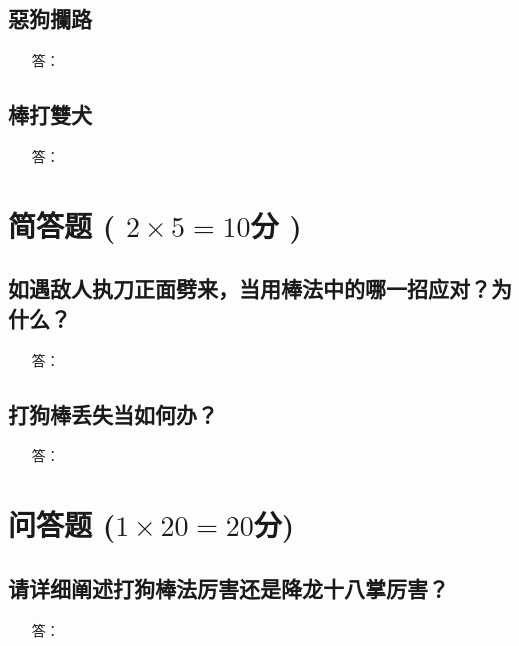 \documentclass[a3]{swfcexam}
\begin{document}
\subsection*{惡狗攔路}
\begin{itemize}
\item[答：] 
\end{itemize}
\vspace{20em}

\subsection*{棒打雙犬}
\begin{itemize}
\item[答：] 
\end{itemize}

\vspace{20em}

\vfill%
\section{简答题 ( $2\times 5=10$分 )}

\subsection{如遇敌人执刀正面劈来，当用棒法中的哪一招应对？为什么？}
\begin{itemize}
\item[答：] 
\end{itemize}

\vspace{20em}
\vfill%
\subsection{打狗棒丢失当如何办？}
\begin{itemize}
\item[答：] 
\end{itemize}

\vspace{20em}
\vfill%
\section{问答题 ($1\times{}20=20$分)}
\subsection{请详细阐述打狗棒法厉害还是降龙十八掌厉害？}
\begin{itemize}
\item[答：] 
\end{itemize}

\vspace{20em}
\end{document}
